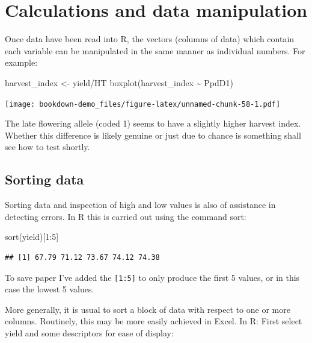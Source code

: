 \documentclass[
]{book}
\newenvironment{Shaded}{\begin{snugshade}}{\end{snugshade}}
\newcommand{\DecValTok}[1]{\textcolor[rgb]{0.00,0.00,0.81}{#1}}
\newcommand{\FunctionTok}[1]{\textcolor[rgb]{0.00,0.00,0.00}{#1}}
\newcommand{\NormalTok}[1]{#1}
\newcommand{\OtherTok}[1]{\textcolor[rgb]{0.56,0.35,0.01}{#1}}
\newcommand{\SpecialCharTok}[1]{\textcolor[rgb]{0.00,0.00,0.00}{#1}}
\begin{document}
\hypertarget{calculations-and-data-manipulation}{%
\section{Calculations and data manipulation}\label{calculations-and-data-manipulation}}

Once data have been read into R, the vectors (columns of data) which contain each variable can be manipulated in the same manner as individual numbers. For example:

\begin{Shaded}
\begin{Highlighting}[]
\NormalTok{harvest\_index }\OtherTok{\textless{}{-}}\NormalTok{ yield}\SpecialCharTok{/}\NormalTok{HT}
\FunctionTok{boxplot}\NormalTok{(harvest\_index }\SpecialCharTok{\textasciitilde{}}\NormalTok{ PpdD1)}
\end{Highlighting}
\end{Shaded}

\texttt{[image: bookdown-demo\_files/figure-latex/unnamed-chunk-58-1.pdf]}

The late flowering allele (coded 1) seems to have a slightly higher harvest index. Whether this difference is likely genuine or just due to chance is something shall see how to test shortly.

\hypertarget{sorting-data}{%
\subsection{Sorting data}\label{sorting-data}}

Sorting data and inspection of high and low values is also of assistance in detecting errors. In R this is carried out using the command sort:

\begin{Shaded}
\begin{Highlighting}[]
\FunctionTok{sort}\NormalTok{(yield)[}\DecValTok{1}\SpecialCharTok{:}\DecValTok{5}\NormalTok{]}
\end{Highlighting}
\end{Shaded}

\begin{verbatim}
## [1] 67.79 71.12 73.67 74.12 74.38
\end{verbatim}

To save paper I've added the \texttt{{[}1:5{]}} to only produce the first 5 values, or in this case the lowest 5 values.

More generally, it is usual to sort a block of data with respect to one or more columns. Routinely, this may be more easily achieved in Excel. In R: First select yield and some descriptors for ease of display:
\end{document}
